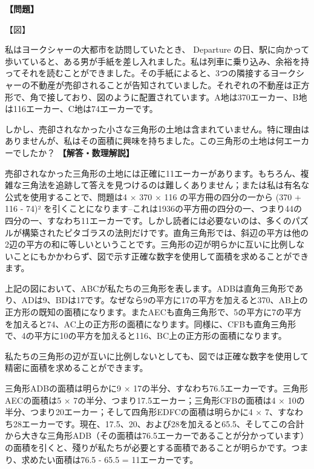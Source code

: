 \documentclass[10pt,a4paper,oneside,openany]{ltjsbook}
\begin{document}
\begin{tcolorbox}[colback=softblue,colframe=primaryblue,title=\textbf{第 189 問：ヨークシャーの不動産 （原題: THE YORKSHIRE ESTATES.）},arc=2mm,boxrule=1pt,breakable]
\textbf{【問題】}\par\vspace{0.3em}
【図】

私はヨークシャーの大都市を訪問していたとき、 Departure の日、駅に向かって歩いていると、ある男が手紙を差し入れました。私は列車に乗り込み、余裕を持ってそれを読むことができました。その手紙によると、3つの隣接するヨークシャーの不動産が売卻されることが告知されていました。それぞれの不動産は正方形で、角で接しており、図のように配置されています。A地は370エーカー、B地は116エーカー、C地は74エーカーです。

しかし、売卻されなかった小さな三角形の土地は含まれていません。特に理由はありませんが、私はその面積に興味を持ちました。この三角形の土地は何エーカーでしたか？
\tcblower
\textbf{【解答・数理解説】}\par\vspace{0.3em}
売卻されなかった三角形の土地には正確に11エーカーがあります。もちろん、複雑な三角法を追跡して答えを見つけるのは難しくありません；または私は有名な公式を使用することで、問題は4 × 370 × 116 の平方冊の四分の一から (370 + 116 - 74)² を引くことになります--これは1936の平方冊の四分の一、つまり44の四分の一、すなわち11エーカーです。しかし読者には必要ないのは、多くのパズルが構築されたピタゴラスの法則だけです。直角三角形では、斜辺の平方は他の2辺の平方の和に等しいということです。三角形の辺が明らかに互いに比例しないことにもかかわらず、図で示す正確な数字を使用して面積を求めることができます。

上記の図において、ABCが私たちの三角形を表します。ADBは直角三角形であり、ADは9、BDは17です。なぜなら9の平方に17の平方を加えると370、AB上の正方形の既知の面積になります。またAECも直角三角形で、5の平方に7の平方を加えると74、AC上の正方形の面積になります。同様に、CFBも直角三角形で、4の平方に10の平方を加えると116、BC上の正方形の面積になります。

私たちの三角形の辺が互いに比例しないとしても、図では正確な数字を使用して精密に面積を求めることができます。

三角形ADBの面積は明らかに9 × 17の半分、すなわち76.5エーカーです。三角形AECの面積は5 × 7の半分、つまり17.5エーカー；三角形CFBの面積は4 × 10の半分、つまり20エーカー；そして四角形EDFCの面積は明らかに4 × 7、すなわち28エーカーです。現在、17.5、20、および28を加えると65.5、そしてこの合計から大きな三角形ADB（その面積は76.5エーカーであることが分かっています）の面積を引くと、殘りが私たちが必要とする面積であることが明らかです。つまり、求めたい面積は76.5 - 65.5 = 11エーカーです。
\end{tcolorbox}
\end{document}
